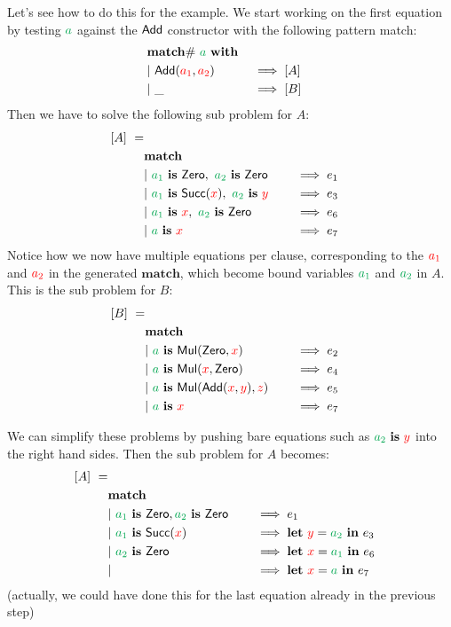 \documentclass[a4paper, 11pt]{article}
\theoremstyle{definition}
\begin{document}
Let's see how to do this for the example. We start working on the first equation by testing $\ba$ against the $\mathsf{\textcolor{black}{Add}}$ constructor with the following pattern match:
\begin{alignat*}{4}
  \matchwithZ{\ba} \\
  \clause{\Add(\fvar{a_1}, \fvar{a_2})}{[A]} \\
  \clause{\_}{[B]}
\end{alignat*}
Then we have to solve the following sub problem for $A$:
\begin{alignat*}{4}
  [A]\ =\\
  \matchclauses \\
  \clause{\bvar{a_1} \is \Zero,\ \bvar{a_2} \is \Zero}{e_1} \\
  \clause{\bvar{a_1} \is \Succ(\fvar x),\ \bvar{a_2} \is \fvar y}{e_3} \\
  \clause{\bvar{a_1} \is \fvar x,\ \bvar{a_2} \is \Zero}{e_6} \\
  \clause{\ba \is \fvar x}{e_7}
\end{alignat*}
Notice how we now have multiple equations per clause, corresponding to the $\textcolor{red}{a_1}$ and $\textcolor{red}{a_2}$ in the generated $\mathbf{match}$, which become bound variables $\bvar{a_1}$ and $\bvar{a_2}$ in $A$. This is the sub problem for $B$:
\begin{alignat*}{4}
  [B]\ =\\
  \matchclauses \\
  \clause{\ba \is \Mul(\Zero, \fvar{x})}{e_2} \\
  \clause{\ba \is \Mul(\fvar x, \Zero)}{e_4} \\
  \clause{\ba \is \Mul(\Add(\fvar x, \fvar y), \fvar z)}{e_5} \\
  \clause{\ba \is \fvar x}{e_7}
\end{alignat*}

We can simplify these problems by pushing bare equations such as $\bvar{a_2} \is \fvar y$ into the right hand sides. Then the sub problem for $A$ becomes:
\begin{alignat*}{4}
  [A]\ =\\
  \matchclauses \\
  \clause{\bvar{a_1} \is \Zero, \bvar{a_2} \is \Zero}{e_1} \\
  \clause{\bvar{a_1} \is \Succ(\fvar x)}{\lett{\fvar y}{\bvar{a_2}} e_3} \\
  \clause{\bvar{a_2} \is \Zero}{\lett{\fvar x}{\bvar{a_1}} e_6} \\
  \clause{}{\lett{\fvar x}{\bvar{a}} e_7}
\end{alignat*}
(actually, we could have done this for the last equation already in the previous step)
\end{document}
